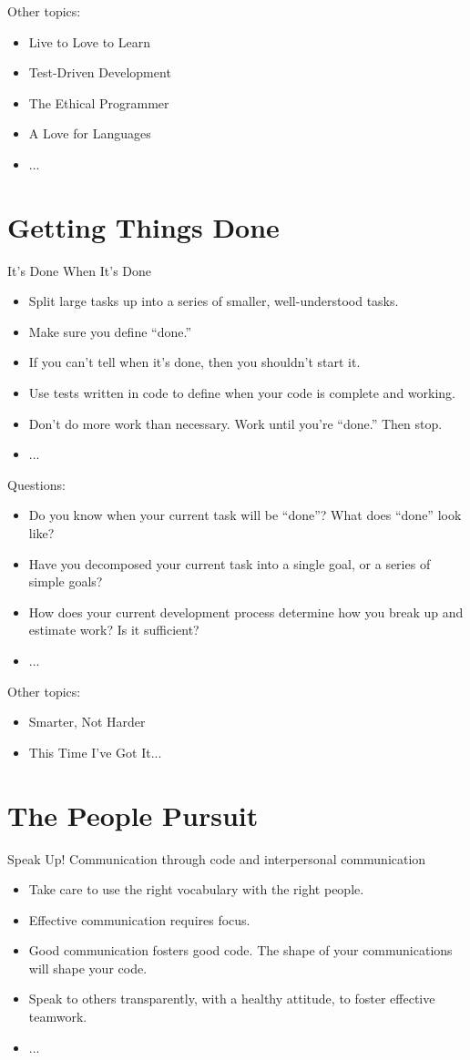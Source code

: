 \documentclass{mypresentation}
\begin{document}
Other topics:
\begin{itemize}
\item Live to Love to Learn
\item Test-Driven Development
\item The Ethical Programmer
\item A Love for Languages
\item ...
\end{itemize}
\newpage

\section{Getting Things Done}
It's Done When It's Done
\begin{itemize}
\item Split large tasks up into a series of smaller, well-understood tasks.
\item Make sure you define “done.”
\item If you can’t tell when it’s done, then you shouldn’t start it.
\item Use tests written in code to define when your code is complete and working.
\item Don’t do more work than necessary. Work until you’re “done.” Then stop.
\item ...
\end{itemize}
\newpage

Questions:
\begin{itemize}
\item Do you know when your current task will be “done”? What does “done” look like?
\item Have you decomposed your current task into a single goal, or a series of simple goals?
\item How does your current development process determine how you break up and estimate work? Is it sufficient?
\item ...
\end{itemize}
\newpage

Other topics:
\begin{itemize}
\item Smarter, Not Harder
\item This Time I've Got It...
\end{itemize}
\newpage

\section{The People Pursuit}
Speak Up! Communication through code and interpersonal communication
\begin{itemize}
\item Take care to use the right vocabulary with the right people.
\item Effective communication requires focus.
\item Good communication fosters good code. The shape of your communications will shape your code.
\item Speak to others transparently, with a healthy attitude, to foster effective teamwork.
\item ...
\end{itemize}
\newpage
\end{document}

